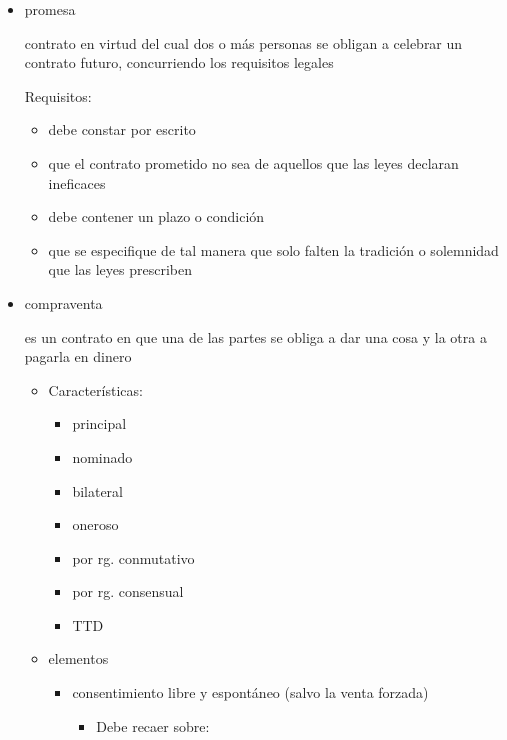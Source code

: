 \documentclass[]{article}
\providecommand{\tightlist}{%
  \setlength{\itemsep}{0pt}\setlength{\parskip}{0pt}}
\begin{document}
\begin{itemize}
\item
  promesa

  contrato en virtud del cual dos o más personas se obligan a celebrar
  un contrato futuro, concurriendo los requisitos legales

  Requisitos:

  \begin{itemize}
  \tightlist
  \item
    debe constar por escrito
  \item
    que el contrato prometido no sea de aquellos que las leyes declaran
    ineficaces
  \item
    debe contener un plazo o condición
  \item
    que se especifique de tal manera que solo falten la tradición o
    solemnidad que las leyes prescriben
  \end{itemize}
\item
  compraventa

  es un contrato en que una de las partes se obliga a dar una cosa y la
  otra a pagarla en dinero

  \begin{itemize}
  \tightlist
  \item
    Características:

    \begin{itemize}
    \tightlist
    \item
      principal
    \item
      nominado
    \item
      bilateral
    \item
      oneroso
    \item
      por rg. conmutativo
    \item
      por rg. consensual
    \item
      TTD
    \end{itemize}
  \item
    elementos

    \begin{itemize}
    \tightlist
    \item
      consentimiento libre y espontáneo (salvo la venta forzada)

      \begin{itemize}
      \tightlist
      \item
        Debe recaer sobre:


\end{itemize}
\end{itemize}
\end{itemize}
\end{itemize}
\end{document}
